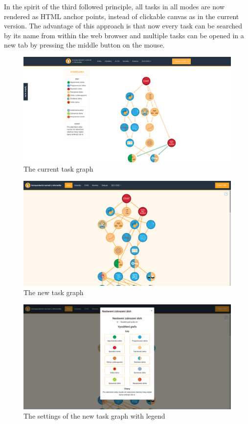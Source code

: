 \documentclass[
  digital, %
  oneside, %
  lof,     %
  lot,     %
]{fithesis4}
\begin{document}
{In the spirit of the third followed principle, all tasks in all modes are now rendered as HTML anchor points, instead of clickable canvas as in the current version. The advantage of this approach is that now every task can be searched by its name from within the web browser and multiple tasks can be opened in a new tab by pressing the middle button on the mouse.

\begin{figure}
\includegraphics[width=\textwidth]{assets/img/graph_curr}
\caption{The current task graph}
\label{fig:graph-curr}
\end{figure}

\begin{figure}
\includegraphics[width=\textwidth]{assets/img/graph_new}
\caption{The new task graph}
\label{fig:graph-new}
\end{figure}

\begin{figure}
\includegraphics[width=\textwidth]{assets/img/graph_newsettings}
\caption{The settings of the new task graph with legend}
\label{fig:graph-new-settings}
\end{figure}

}
\end{document}

